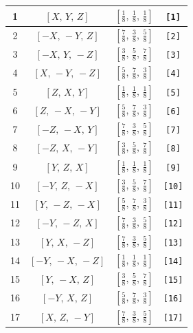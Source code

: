 \documentclass[fleqn,8pt]{jsarticle}
\begin{document}
\begin{longtable}{cccc}
1 & $\left[ X,\, Y,\, Z \right]$ & $\left[ \frac{1}{8},\, \frac{1}{8},\, \frac{1}{8} \right]$ & {\tt [1]} \\ \hline
2 & $\left[ - X,\, - Y,\, Z \right]$ & $\left[ \frac{7}{8},\, \frac{3}{8},\, \frac{5}{8} \right]$ & {\tt [2]} \\ \hline
3 & $\left[ - X,\, Y,\, - Z \right]$ & $\left[ \frac{3}{8},\, \frac{5}{8},\, \frac{7}{8} \right]$ & {\tt [3]} \\ \hline
4 & $\left[ X,\, - Y,\, - Z \right]$ & $\left[ \frac{5}{8},\, \frac{7}{8},\, \frac{3}{8} \right]$ & {\tt [4]} \\ \hline
5 & $\left[ Z,\, X,\, Y \right]$ & $\left[ \frac{1}{8},\, \frac{1}{8},\, \frac{1}{8} \right]$ & {\tt [5]} \\ \hline
6 & $\left[ Z,\, - X,\, - Y \right]$ & $\left[ \frac{5}{8},\, \frac{7}{8},\, \frac{3}{8} \right]$ & {\tt [6]} \\ \hline
7 & $\left[ - Z,\, - X,\, Y \right]$ & $\left[ \frac{7}{8},\, \frac{3}{8},\, \frac{5}{8} \right]$ & {\tt [7]} \\ \hline
8 & $\left[ - Z,\, X,\, - Y \right]$ & $\left[ \frac{3}{8},\, \frac{5}{8},\, \frac{7}{8} \right]$ & {\tt [8]} \\ \hline
9 & $\left[ Y,\, Z,\, X \right]$ & $\left[ \frac{1}{8},\, \frac{1}{8},\, \frac{1}{8} \right]$ & {\tt [9]} \\ \hline
10 & $\left[ - Y,\, Z,\, - X \right]$ & $\left[ \frac{3}{8},\, \frac{5}{8},\, \frac{7}{8} \right]$ & {\tt [10]} \\ \hline
11 & $\left[ Y,\, - Z,\, - X \right]$ & $\left[ \frac{5}{8},\, \frac{7}{8},\, \frac{3}{8} \right]$ & {\tt [11]} \\ \hline
12 & $\left[ - Y,\, - Z,\, X \right]$ & $\left[ \frac{7}{8},\, \frac{3}{8},\, \frac{5}{8} \right]$ & {\tt [12]} \\ \hline
13 & $\left[ Y,\, X,\, - Z \right]$ & $\left[ \frac{7}{8},\, \frac{3}{8},\, \frac{5}{8} \right]$ & {\tt [13]} \\ \hline
14 & $\left[ - Y,\, - X,\, - Z \right]$ & $\left[ \frac{1}{8},\, \frac{1}{8},\, \frac{1}{8} \right]$ & {\tt [14]} \\ \hline
15 & $\left[ Y,\, - X,\, Z \right]$ & $\left[ \frac{3}{8},\, \frac{5}{8},\, \frac{7}{8} \right]$ & {\tt [15]} \\ \hline
16 & $\left[ - Y,\, X,\, Z \right]$ & $\left[ \frac{5}{8},\, \frac{7}{8},\, \frac{3}{8} \right]$ & {\tt [16]} \\ \hline
17 & $\left[ X,\, Z,\, - Y \right]$ & $\left[ \frac{7}{8},\, \frac{3}{8},\, \frac{5}{8} \right]$ & {\tt [17]} \\ \hline

\end{longtable}
\end{document}
